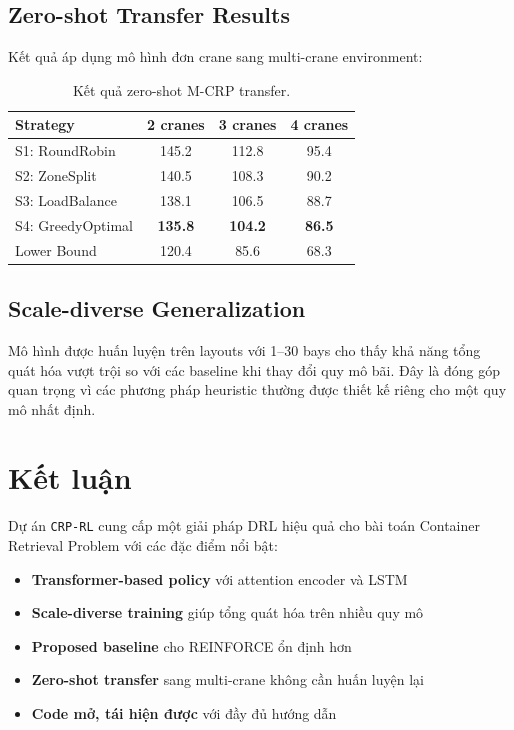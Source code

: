 \documentclass[11pt,a4paper]{article}
\theoremstyle{definition}
\begin{document}
\subsection{Zero-shot Transfer Results}

Kết quả áp dụng mô hình đơn crane sang multi-crane environment:

\begin{table}[h!]
    \centering
    \begin{tabular}{lccc}
        \toprule
        Strategy & 2 cranes & 3 cranes & 4 cranes \\
        \midrule
        S1: RoundRobin & 145.2 & 112.8 & 95.4 \\
        S2: ZoneSplit & 140.5 & 108.3 & 90.2 \\
        S3: LoadBalance & 138.1 & 106.5 & 88.7 \\
        S4: GreedyOptimal & \textbf{135.8} & \textbf{104.2} & \textbf{86.5} \\
        Lower Bound & 120.4 & 85.6 & 68.3 \\
        \bottomrule
    \end{tabular}
    \caption{Kết quả zero-shot M-CRP transfer.}
    \label{tab:zeroshot}
\end{table}

\subsection{Scale-diverse Generalization}

Mô hình được huấn luyện trên layouts với 1--30 bays cho thấy khả năng tổng quát hóa vượt trội so với các baseline khi thay đổi quy mô bãi. Đây là đóng góp quan trọng vì các phương pháp heuristic thường được thiết kế riêng cho một quy mô nhất định.

\newpage

\section{Kết luận}

Dự án \texttt{CRP-RL} cung cấp một giải pháp DRL hiệu quả cho bài toán Container Retrieval Problem với các đặc điểm nổi bật:

\begin{itemize}
    \item \textbf{Transformer-based policy} với attention encoder và LSTM
    \item \textbf{Scale-diverse training} giúp tổng quát hóa trên nhiều quy mô
    \item \textbf{Proposed baseline} cho REINFORCE ổn định hơn
    \item \textbf{Zero-shot transfer} sang multi-crane không cần huấn luyện lại
    \item \textbf{Code mở, tái hiện được} với đầy đủ hướng dẫn
\end{itemize}
\end{document}
